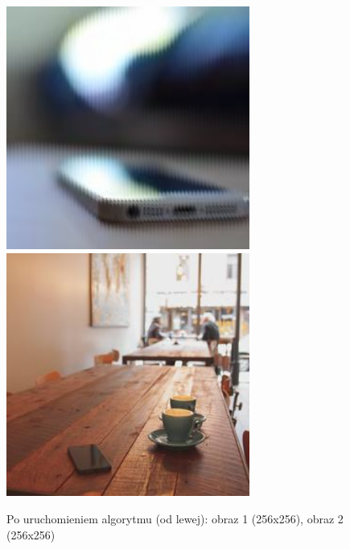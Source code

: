 \documentclass[a4paper,12pt]{book}
\begin{document}
\begin{figure}[H]
	\caption{Po uruchomieniem algorytmu (od lewej): obraz 1 (256x256), obraz 2 (256x256)}
	\includegraphics[width=8cm, height=8cm]{1-4/raster-color-phone-coffee.png}
	\includegraphics[width=8cm, height=8cm]{1-4/raster-color-coffee-phone.png}
\end{figure}
\end{document}
